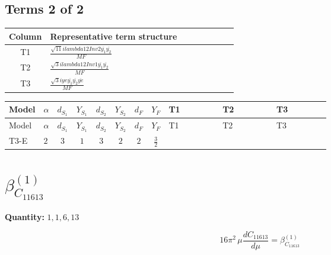 \documentclass[8pt]{article}
\begin{document}
\begin{landscape}
\subsection*{Terms 2 of 2}
\begin{center}
\begin{tabular}{@{}c >{\raggedright\arraybackslash}p{0.82\linewidth}@{}}
\toprule
Column & Representative term structure \\
\midrule
T1 & \(\displaystyle \frac{\sqrt{11} i lambda12Inv2 \overline{y_{1}} \overline{y_{2}}}{MF}\) \\
\midrule
T2 & \(\displaystyle \frac{\sqrt{3} i lambda12Inv1 \overline{y_{1}} \overline{y_{2}}}{MF}\) \\
\midrule
T3 & \(\displaystyle \frac{\sqrt{3} i ye \overline{y_{1}} \overline{y_{2}} \overline{ye}}{MF}\) \\
\midrule
\bottomrule
\end{tabular}
\end{center}
\smallskip
\tiny
\begin{longtable}{@{}llcccccc >{\raggedright\arraybackslash}p{0.21\linewidth} >{\raggedright\arraybackslash}p{0.21\linewidth} >{\raggedright\arraybackslash}p{0.21\linewidth}@{}}
\toprule
Model & $\alpha$ & $d_{S_1}$ & $Y_{S_1}$ & $d_{S_2}$ & $Y_{S_2}$ & $d_F$ & $Y_F$ & T1 & T2 & T3 \\
\midrule
\endfirsthead
\toprule
Model & $\alpha$ & $d_{S_1}$ & $Y_{S_1}$ & $d_{S_2}$ & $Y_{S_2}$ & $d_F$ & $Y_F$ & T1 & T2 & T3 \\
\midrule
\endhead
T3-E & $2$ & $3$ & $1$ & $3$ & $2$ & $2$ & $\frac{3}{2}$ & \scriptsize\adjustbox{max width=\linewidth}{$\begin{gathered} - \frac{3 \sqrt{11} i lambda12Inv2 \overline{y_{1}} \overline{y_{2}}}{22 MF}\end{gathered}$} & \scriptsize\adjustbox{max width=\linewidth}{$\begin{gathered} \frac{\sqrt{3} i lambda12Inv1 \overline{y_{1}} \overline{y_{2}}}{6 MF}\end{gathered}$} & \scriptsize\adjustbox{max width=\linewidth}{$\begin{gathered} \frac{\sqrt{3} i ye \overline{y_{1}} \overline{y_{2}} \overline{ye}}{12 MF}\end{gathered}$} \\
\midrule
\bottomrule
\end{longtable}
\clearpage
\section*{$\beta_{C_{11613}}^{(1)}$}
\noindent\textbf{Quantity: }$\mathrm{1,1,6,13}$\par\smallskip
\[16\pi^2\,\mu\frac{d C_{11613}}{d\mu}=\beta_{C_{11613}}^{(1)}\]

\end{landscape}
\end{document}
